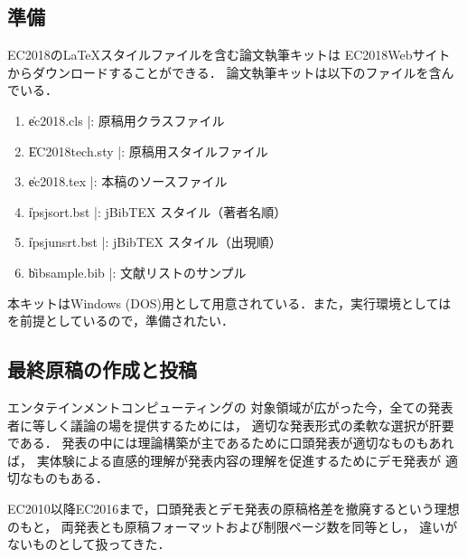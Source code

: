 \subsection{準備}
EC2018の\LaTeX スタイルファイルを含む論文執筆キットは
EC2018Webサイトからダウンロードすることができる．
論文執筆キットは以下のファイルを含んでいる．
\begin{enumerate}
\item \|ec2018.cls     |: 原稿用クラスファイル
\item \|EC2018tech.sty |: 原稿用スタイルファイル
\item \|ec2018.tex     |: 本稿のソースファイル
\item \|ipsjsort.bst  |: jBibTEX スタイル（著者名順）
\item \|ipsjunsrt.bst |: jBibTEX スタイル（出現順）
\item \|bibsample.bib |: 文献リストのサンプル
\end{enumerate}
本キットはWindows (DOS)用として用意されている．また，実行環境としては
\LaTeXe を前提としているので，準備されたい．


\subsection{最終原稿の作成と投稿}

エンタテインメントコンピューティングの
対象領域が広がった今，全ての発表者に等しく議論の場を提供するためには，
適切な発表形式の柔軟な選択が肝要である．
発表の中には理論構築が主であるために口頭発表が適切なものもあれば，
実体験による直感的理解が発表内容の理解を促進するためにデモ発表が
適切なものもある．

EC2010以降EC2016まで，口頭発表とデモ発表の原稿格差を撤廃するという理想のもと，
両発表とも原稿フォーマットおよび制限ページ数を同等とし，
違いがないものとして扱ってきた．

